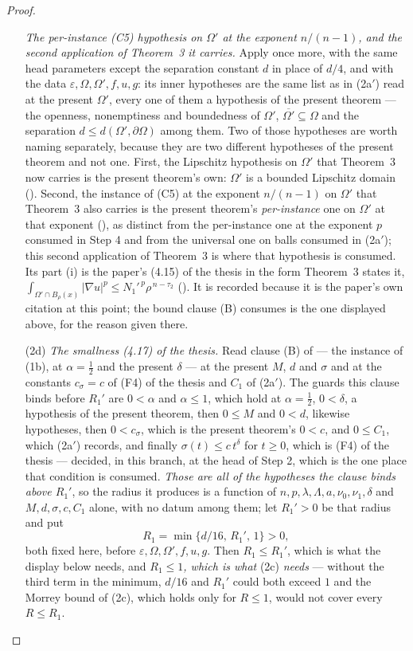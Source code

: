\begin{proof}
\begin{enumerate}
  \emph{The per-instance \textup{(C5)} hypothesis on $\Omega'$ at the exponent
  $n/(n-1)$, and the second application of Theorem~3 it carries.}  Apply
   once more, with the same head parameters
  except the separation constant $d$ in place of $d/4$, and with the data
  $\varepsilon,\Omega,\Omega',f,u,g$: its inner hypotheses are the same list as
  in (2a$'$) read at the present $\Omega'$, every one of them a hypothesis of
  the present theorem --- the openness, nonemptiness and boundedness of
  $\Omega'$, $\overline{\Omega'}\subseteq\Omega$ and the separation
  $d\le d(\Omega',\partial\Omega)$ among them.  Two of those hypotheses are worth
  naming separately, because they are two different hypotheses of the present
  theorem and not one.  First, the Lipschitz hypothesis on $\Omega'$ that
  Theorem~3 now carries is the present theorem's own: $\Omega'$ is a bounded
  Lipschitz domain ().  Second, the instance
  of (C5) at the exponent $n/(n-1)$ on $\Omega'$ that Theorem~3 also carries is
  the present theorem's \emph{per-instance} one on $\Omega'$ at that exponent
  (), as distinct from the per-instance one at
  the exponent $p$ consumed in Step 4 and from the universal one on balls
  consumed in (2a$'$); this second application of Theorem~3 is where that
  hypothesis is consumed.  Its part (i) is the paper's (4.15) of the thesis in the
  form Theorem~3 states it,
  $\int_{\Omega'\cap B_\rho(x)}|\nabla u|^p\le N_1'^{\,p}\rho^{\,n-\tau_2}$
  ().  It is recorded because it is the paper's own
  citation at this point; the bound clause (B) consumes is the one displayed
  above, for the reason given there.
\item[(2d)] \emph{The smallness (4.17) of the thesis.}  Read clause (B) of
   --- the instance of (1b), at
  $\alpha=\tfrac12$ and the present $\delta$ --- at the present $M$, $d$ and
  $\sigma$ and at the constants $c_\sigma=c$ of (F4) of the thesis and
  $C_1$ of (2a$'$).  The guards this clause binds before $R_1'$ are $0<\alpha$
  and $\alpha\le1$, which hold at $\alpha=\tfrac12$, $0<\delta$, a hypothesis of
  the present theorem, then $0\le M$ and $0<d$, likewise hypotheses, then
  $0<c_\sigma$, which is the present theorem's $0<c$, and $0\le C_1$, which
  (2a$'$) records, and finally $\sigma(t)\le c\,t^{\delta}$ for $t\ge0$, which is
  (F4) of the thesis --- decided, in this branch, at the head of Step 2, which is the
  one place that condition is consumed.  \emph{Those are all of the hypotheses
  the clause binds above $R_1'$}, so the radius it produces is a function of
  $n,p,\lambda,\Lambda,a,\nu_0,\nu_1,\delta$ and $M,d,\sigma,c,C_1$ alone, with
  no datum among them; let $R_1'>0$ be that radius and put
  \[
  R_1=\min\{d/16,\,R_1',\,1\}>0 ,
  \]
  both fixed here, before $\varepsilon,\Omega,\Omega',f,u,g$.  Then
  $R_1\le R_1'$, which is what the display below needs, and \emph{$R_1\le1$,
  which is what} (2c) \emph{needs} --- without the third term in the minimum,
  $d/16$ and $R_1'$ could both exceed $1$ and the Morrey bound of (2c), which
  holds only for $R\le1$, would not cover every $R\le R_1$.


\end{enumerate}
\end{proof}
